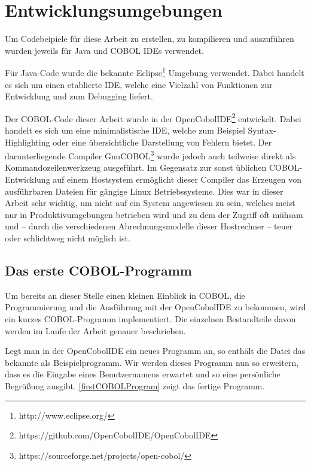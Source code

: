 \section{Entwicklungsumgebungen}
Um Codebeipiele für diese Arbeit zu erstellen, zu kompilieren und auszuführen wurden jeweils für Java und COBOL IDEs verwendet.

Für Java-Code wurde die bekannte Eclipse\footnote{http://www.eclipse.org/} Umgebung verwendet. Dabei handelt es sich um einen etablierte IDE, welche eine Vielzahl von Funktionen zur Entwicklung und zum Debugging liefert.

Der COBOL-Code dieser Arbeit wurde in der OpenCobolIDE\footnote{https://github.com/OpenCobolIDE/OpenCobolIDE} entwickelt. Dabei handelt es sich um eine minimalistische IDE, welche zum Beispiel Syntax-Highlighting oder eine übersichtliche Darstellung von Fehlern bietet. Der darunterliegende Compiler GnuCOBOL\footnote{https://sourceforge.net/projects/open-cobol/} wurde jedoch auch teilweise direkt als Kommandozeilenwerkzeug ausgeführt. Im Gegensatz zur sonst üblichen COBOL-Entwicklung auf einem Hostsystem ermöglicht dieser Compiler das Erzeugen von ausführbaren Dateien für gängige Linux Betriebssysteme. Dies war in dieser Arbeit sehr wichtig, um nicht auf ein System angewiesen zu sein, welches meist nur in Produktivumgebungen betrieben wird und zu dem der Zugriff oft mühsam und -- durch die verschiedenen Abrechnungsmodelle dieser Hostrechner -- teuer oder schlichtweg nicht möglich ist.

\subsection*{Das erste COBOL-Programm}

Um bereits an dieser Stelle einen kleinen Einblick in COBOL, die Programmierung und die Ausführung mit der OpenCobolIDE zu bekommen, wird ein kurzes COBOL-Programm implementiert. Die einzelnen Bestandteile davon werden im Laufe der Arbeit genauer beschrieben.


Legt man in der OpenCobolIDE ein neues Programm an, so enthält die Datei das bekannte  als Beispielprogramm. Wir werden dieses Programm nun so erweitern, dass es die Eingabe eines Benutzernamens erwartet und so eine persönliche Begrüßung ausgibt. \autoref{firstCOBOLProgram} zeigt das fertige Programm.

